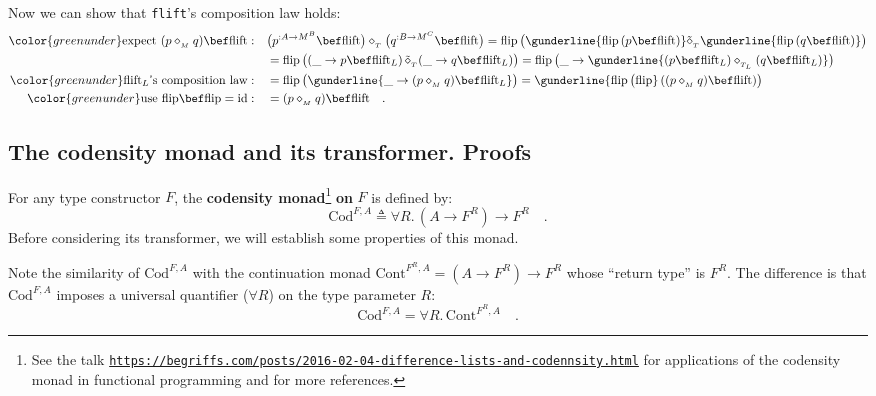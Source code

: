 Now we can show that \lstinline!flift!\textsf{'}s composition law holds:
\begin{align*}
{\color{greenunder}\text{expect }(p\diamond_{_{M}}q)\bef\text{flift}:}\quad & \big(p^{:A\rightarrow M^{B}}\bef\text{flift}\big)\diamond_{_{T}}\big(q^{:B\rightarrow M^{C}}\bef\text{flift}\big)=\text{flip}\,\big(\gunderline{\text{flip}\,(p\bef\text{flift})}\tilde{\diamond}_{_{T}}\gunderline{\text{flip}\,(q\bef\text{flift})}\big)\\
 & =\text{flip}\,\big((\_\rightarrow p\bef\text{flift}_{L})\,\tilde{\diamond}_{_{T}}(\_\rightarrow q\bef\text{flift}_{L})\big)=\text{flip}\,\big(\_\rightarrow\gunderline{(p\bef\text{flift}_{L})\diamond_{_{T_{L}}}(q\bef\text{flift}_{L})}\big)\\
{\color{greenunder}\text{flift}_{L}\text{\textsf{'}s composition law}:}\quad & =\text{flip}\,\big(\gunderline{\_\rightarrow(p\diamond_{_{M}}q)\bef\text{flift}_{L}}\big)=\gunderline{\text{flip}\,\big(\text{flip}}\,((p\diamond_{_{M}}q)\bef\text{flift})\big)\\
{\color{greenunder}\text{use }\text{flip}\bef\text{flip}=\text{id}:}\quad & =(p\diamond_{_{M}}q)\bef\text{flift}\quad.
\end{align*}


\subsection{The codensity monad and its transformer. Proofs\label{subsec:The-codensity-monad}}

For any type constructor $F$, the \textbf{codensity
monad}\footnote{See the talk \texttt{\href{https://begriffs.com/posts/2016-02-04-difference-lists-and-codennsity.html}{https://begriffs.com/posts/2016-02-04-difference-lists-and-codennsity.html}}
for applications of the codensity monad in functional programming
and for more references.} \textbf{on} $F$ is defined by:
\[
\text{Cod}^{F,A}\triangleq\forall R.\,(A\rightarrow F^{R})\rightarrow F^{R}\quad.
\]
Before considering its transformer, we will establish some properties
of this monad.

Note the similarity of $\text{Cod}^{F,A}$ with the continuation monad
$\text{Cont}^{F^{R},A}=(A\rightarrow F^{R})\rightarrow F^{R}$ whose
\textsf{``}return type\textsf{''} is $F^{R}$. The difference is that $\text{Cod}^{F,A}$
imposes a universal quantifier ($\forall R$) on the type parameter
$R$:
\[
\text{Cod}^{F,A}=\forall R.\,\text{Cont}^{F^{R},A}\quad.
\]


